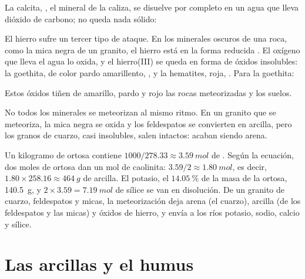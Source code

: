 \begin{proposition}\label{prop:g10:soil-formation:calcite}
La calcita, , el mineral de la caliza, se disuelve por completo en
un agua que lleva dióxido de carbono; no queda nada sólido:
\begin{center}
\end{center}
\end{proposition}

El hierro sufre un tercer tipo de ataque. En los minerales oscuros de una
roca, como la mica negra de un granito, el hierro está en la forma reducida
. El oxígeno que lleva el agua lo oxida, y el hierro(III) se queda
en forma de óxidos insolubles: la goethita, de color pardo amarillento,
, y la hematites, roja, . Para la goethita:
\begin{center}
\end{center}
Estos óxidos tiñen de amarillo, pardo y rojo las rocas meteorizadas y los
suelos.

No todos los minerales se meteorizan al mismo ritmo. En un granito que se
meteoriza, la mica negra se oxida y los feldespatos se convierten en arcilla,
pero los granos de cuarzo, casi insolubles, salen intactos: acaban siendo
arena.

\begin{example}\label{ex:g10:soil-formation:granite}
Un kilogramo de ortosa contiene $1000/278.33 \approx \qty{3.59}{mol}$ de
. Según la ecuación, dos moles de ortosa dan un mol de
caolinita: $3.59/2 \approx \qty{1.80}{mol}$, es decir, $1.80 \times 258.16
\approx \qty{464}{g}$ de arcilla. El potasio, el $14.05~\%$ de la masa de la
ortosa, \qty{140.5}{g}, y $2 \times 3.59 = \qty{7.19}{mol}$ de sílice
se van en disolución. De un granito de cuarzo, feldespatos y micas, la
meteorización deja arena (el cuarzo), arcilla (de los feldespatos y las
micas) y óxidos de hierro, y envía a los ríos potasio, sodio, calcio y sílice.
\end{example}

\section{Las arcillas y el humus}

